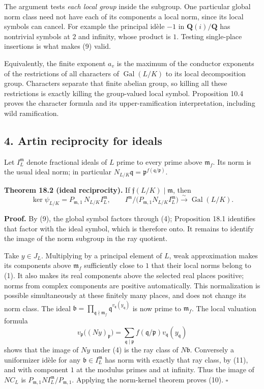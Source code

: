 \documentclass[11pt,a4paper]{article}
\begin{document}
The argument tests \emph{each local group} inside the subgroup. One
particular global norm class need not have each of its components a
local norm, since its local symbols can cancel. For example the
principal idèle \(-1\) in \(\mathbf Q(i)/\mathbf Q\) has nontrivial
symbols at \(2\) and infinity, whose product is \(1\). Testing
single-place insertions is what makes (9) valid.

Equivalently, the finite exponent \(a_v\) is the maximum of the
conductor exponents of the restrictions of all characters of
\(\operatorname{Gal}(L/K)\) to its local decomposition group. Characters
separate that finite abelian group, so killing all these restrictions is
exactly killing the group-valued local symbol. Proposition 10.4 proves
the character formula and its upper-ramification interpretation,
including wild ramification.

\subsection{4. Artin reciprocity for
ideals}\label{artin-reciprocity-for-ideals}

Let \(I_L^{\mathfrak m}\) denote fractional ideals of \(L\) prime to
every prime above \(\mathfrak m_f\). Its norm is the usual ideal norm;
in particular
\(N_{L/K}\mathfrak q=\mathfrak p^{f(\mathfrak q/\mathfrak p)}\).

\textbf{Theorem 18.2 (ideal reciprocity).} If
\(\mathfrak f(L/K)\mid\mathfrak m\), then \[
\ker\psi_{L/K}=P_{\mathfrak m,1}\,N_{L/K}I_L^{\mathfrak m},
\qquad
I^{\mathfrak m}/\bigl(P_{\mathfrak m,1}N_{L/K}I_L^{\mathfrak m}\bigr)
\xrightarrow{\sim}\operatorname{Gal}(L/K).
\tag{10}
\]

\textbf{Proof.} By (9), the global symbol factors through (4);
Proposition 18.1 identifies that factor with the ideal symbol, which is
therefore onto. It remains to identify the image of the norm subgroup in
the ray quotient.

Take \(y\in J_L\). Multiplying by a principal element of \(L\), weak
approximation makes its components above \(\mathfrak m_f\) sufficiently
close to \(1\) that their local norms belong to (1). It also makes its
real components above the selected real places positive; norms from
complex components are positive automatically. This normalization is
possible simultaneously at these finitely many places, and does not
change its norm class. The ideal
\(\mathfrak b=\prod_{\mathfrak q\nmid\mathfrak m_f}\mathfrak q^{v_{\mathfrak q}(y_{\mathfrak q})}\)
is now prime to \(\mathfrak m_f\). The local valuation formula \[
v_{\mathfrak p}\bigl((Ny)_{\mathfrak p}\bigr)
=\sum_{\mathfrak q\mid\mathfrak p}f(\mathfrak q/\mathfrak p)
v_{\mathfrak q}(y_{\mathfrak q})
\tag{11}
\] shows that the image of \(Ny\) under (4) is the ray class of
\(N\mathfrak b\). Conversely a uniformizer idèle for any
\(\mathfrak b\in I_L^{\mathfrak m}\) has norm with exactly that ray
class, by (11), and with component \(1\) at the modulus primes and at
infinity. Thus the image of \(NC_L\) is
\(P_{\mathfrak m,1}NI_L^{\mathfrak m}/P_{\mathfrak m,1}\). Applying the
norm-kernel theorem proves (10). \(\square\)
\end{document}
